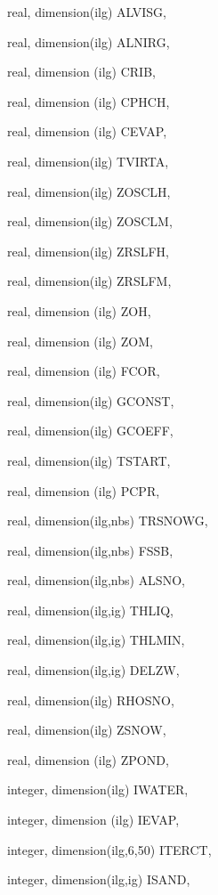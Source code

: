{\begin{DoxyParamCaption}
\item[{real, dimension(ilg)}]{A\+L\+V\+I\+S\+G, }
\item[{real, dimension(ilg)}]{A\+L\+N\+I\+R\+G, }
\item[{real, dimension  (ilg)}]{C\+R\+I\+B, }
\item[{real, dimension (ilg)}]{C\+P\+H\+C\+H, }
\item[{real, dimension (ilg)}]{C\+E\+V\+A\+P, }
\item[{real, dimension(ilg)}]{T\+V\+I\+R\+T\+A, }
\item[{real, dimension(ilg)}]{Z\+O\+S\+C\+L\+H, }
\item[{real, dimension(ilg)}]{Z\+O\+S\+C\+L\+M, }
\item[{real, dimension(ilg)}]{Z\+R\+S\+L\+F\+H, }
\item[{real, dimension(ilg)}]{Z\+R\+S\+L\+F\+M, }
\item[{real, dimension   (ilg)}]{Z\+O\+H, }
\item[{real, dimension   (ilg)}]{Z\+O\+M, }
\item[{real, dimension  (ilg)}]{F\+C\+O\+R, }
\item[{real, dimension(ilg)}]{G\+C\+O\+N\+S\+T, }
\item[{real, dimension(ilg)}]{G\+C\+O\+E\+F\+F, }
\item[{real, dimension(ilg)}]{T\+S\+T\+A\+R\+T, }
\item[{real, dimension  (ilg)}]{P\+C\+P\+R, }
\item[{real, dimension(ilg,nbs)}]{T\+R\+S\+N\+O\+W\+G, }
\item[{real, dimension(ilg,nbs)}]{F\+S\+S\+B, }
\item[{real, dimension(ilg,nbs)}]{A\+L\+S\+N\+O, }
\item[{real, dimension(ilg,ig)}]{T\+H\+L\+I\+Q, }
\item[{real, dimension(ilg,ig)}]{T\+H\+L\+M\+I\+N, }
\item[{real, dimension(ilg,ig)}]{D\+E\+L\+Z\+W, }
\item[{real, dimension(ilg)}]{R\+H\+O\+S\+N\+O, }
\item[{real, dimension(ilg)}]{Z\+S\+N\+O\+W, }
\item[{real, dimension (ilg)}]{Z\+P\+O\+N\+D, }
\item[{integer, dimension(ilg)}]{I\+W\+A\+T\+E\+R, }
\item[{integer, dimension (ilg)}]{I\+E\+V\+A\+P, }
\item[{integer, dimension(ilg,6,50)}]{I\+T\+E\+R\+C\+T, }
\item[{integer, dimension(ilg,ig)}]{I\+S\+A\+N\+D, }

\end{DoxyParamCaption}}
